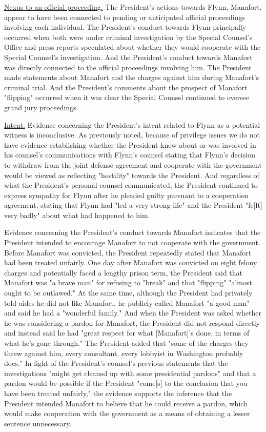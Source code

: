 {

\underline{Nexus to an official proceeding.}
The President's actions towards Flynn, Manafort, appear to have been connected to pending or anticipated official proceedings involving each individual.
The President's conduct towards Flynn principally occurred when both were under criminal investigation by the Special Counsel's Office and press reports speculated about whether they would cooperate with the Special Counsel's investigation.
And the President's conduct towards Manafort was directly connected to the official proceedings involving him.
The President made statements about Manafort and the charges against him during Manafort's criminal trial.
And the President's comments about the prospect of Manafort "flipping" occurred when it was clear the Special Counsel continued to oversee grand jury proceedings.

\underline{Intent.}
Evidence concerning the President's intent related to Flynn as a potential witness is inconclusive.
As previously noted, because of privilege issues we do not have evidence establishing whether the President knew about or was involved in his counsel's communications with Flynn's counsel stating that Flynn's decision to withdraw from the joint defense agreement and cooperate with the government would be viewed as reflecting "hostility" towards the President.
And regardless of what the President's personal counsel communicated, the President continued to express sympathy for Flynn after he pleaded guilty pursuant to a cooperation agreement, stating that Flynn had "led a very strong life" and the President "fe[lt] very badly" about what had happened to him.

Evidence concerning the President's conduct towards Manafort indicates that the President intended to encourage Manafort to not cooperate with the government.
Before Manafort was convicted, the President repeatedly stated that Manafort had been treated unfairly.
One day after Manafort was convicted on eight felony charges and potentially faced a lengthy prison term, the President said that Manafort was "a brave man" for refusing to "break" and that "flipping" "almost ought to be outlawed."
At the same time, although the President had privately told aides he did not like Manafort, he publicly called Manafort "a good man" and said he had a "wonderful family."
And when the President was asked whether he was considering a pardon for Manafort, the President did not respond directly and instead said he had "great respect for what [Manafort]'s done, in terms of what he's gone through."
The President added that "some of the charges they threw against him, every consultant, every lobbyist in Washington probably does."
In light of the President's counsel's previous statements that the investigations "might get cleaned up with some presidential pardons" and that a pardon would be possible if the President "come[s] to the conclusion that you have been treated unfairly," the evidence supports the inference that the President intended Manafort to believe that he could receive a pardon, which would make cooperation with the government as a means of obtaining a lesser sentence unnecessary.

}

